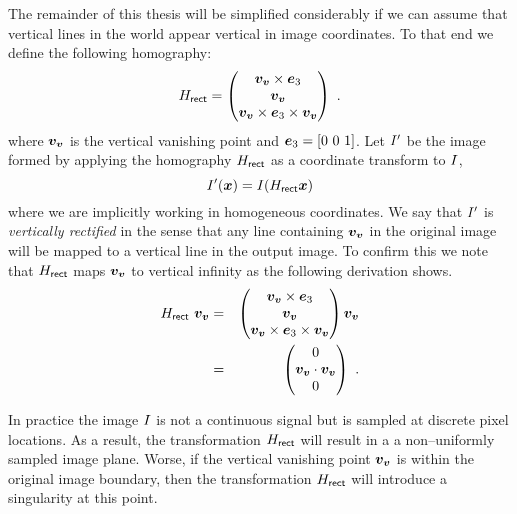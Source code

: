 The remainder of this thesis will be simplified considerably if we can
assume that vertical lines in the world appear vertical in image
coordinates. To that end we define the following homography:
\begin{equation}
  \label{eq:rectifier}
  \Rectifier =
  \begin{pmatrix}
    \vvpt \times \ez \\
    \vvpt \\
    \vvpt \times \ez \times \vvpt
  \end{pmatrix} ~.
\end{equation}
where $\vvpt$ is the vertical vanishing point and $\ez=[0~0~1]$.
Let $\Image'$ be the image formed by applying the homography $\Rectifier$ as a
coordinate transform to $\Image$,
\begin{equation}
  \label{eq:rectification}
  \Image'(\vect{x}) = \Image(\Rectifier \vect{x})
\end{equation}
where we are implicitly working in homogeneous coordinates. We say
that $\Image'$ is \textit{vertically rectified} in the sense that any
line containing $\vvpt$ in the original image will be mapped to a
vertical line in the output image. To confirm this we note that
$\Rectifier$ maps $\vvpt$ to vertical infinity as the following
derivation shows.\changedsinceviva
\begin{eqnarray}
  \Rectifier ~ \vvpt &=&   
    \begin{pmatrix}
      \vvpt \times \ez \\
      \vvpt \\
      \vvpt \times \ez \times \vvpt
    \end{pmatrix} \vvpt \\
  &=&
    \begin{pmatrix}
      0 \\ \vvpt \cdot \vvpt \\ 0
    \end{pmatrix} ~.
\end{eqnarray}

In practice the image $\Image$ is not a continuous signal but is
sampled at discrete pixel locations. As a result, the transformation
$\Rectifier$ will result in a a non--uniformly sampled image
plane. Worse, if the vertical vanishing point $\vvpt$ is within the
original image boundary, then the transformation $\Rectifier$ will
introduce a singularity at this point.

